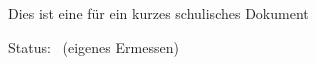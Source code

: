 \documentclass[12pt,a4paper,ngerman,numbers=noenddot,toc=listof]{scrartcl}	%
\begin{document}
\setcounter{headpages}{0}
Dies ist eine \TITEL{} für ein kurzes schulisches Dokument

\newpage
\appendix
\vfill
\printlicense
\printendsignature
\newpage\Statistiken
Status:~ (eigenes Ermessen)
  \begin{sourcefiletable}{1}
  \end{sourcefiletable}
%	
\end{document}
